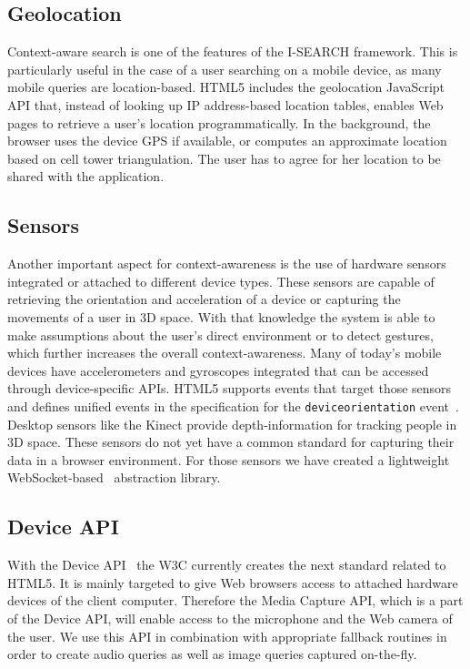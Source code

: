 \documentclass[runningheads,a4paper]{llncs} \usepackage[utf8]{inputenc}
\begin{document}
\subsection{Geolocation}
Context-aware search is one of the features of the \mbox{I-SEARCH} framework. This is particularly useful in the case of a user searching on a mobile device, as many mobile queries are location-based. HTML5 includes the geolocation JavaScript API that, instead of looking up IP address-based location tables, enables Web pages to retrieve a user's
location programmatically. In the background, the browser uses the device GPS if available, or computes an approximate location based on cell tower triangulation. The user has to agree for her location to be shared with the application.

\subsection{Sensors}
Another important aspect for context-awareness is the use of hardware sensors integrated or attached to different device types. These sensors are capable of retrieving the orientation and acceleration of a device or capturing the movements of a user in 3D space. With that knowledge the system is able to make assumptions about the user's
direct environment or to detect gestures, which further increases the overall context-awareness. Many of today's mobile devices have accelerometers and gyroscopes integrated that can be accessed through device-specific APIs. HTML5 supports events that target those sensors and defines unified events in the specification for the \texttt{deviceorientation} event~\cite{deviceOrientation}. Desktop sensors like the Kinect provide depth-information for tracking people in 3D space. These sensors do not yet have a common standard for capturing their data in a browser environment. For those sensors we have created a lightweight WebSocket-based~\cite{websockets} abstraction library.

\subsection{Device API}
With the Device API~\cite{deviceAPI} the W3C currently creates the next standard related to HTML5. It is mainly targeted to give Web browsers access to attached hardware devices of the client computer. Therefore the Media Capture API, which is a part of the Device API, will enable access to the microphone and the Web camera of the user. We use this API in combination with appropriate fallback routines in order to create audio queries as well as image queries captured on-the-fly.
\end{document}

